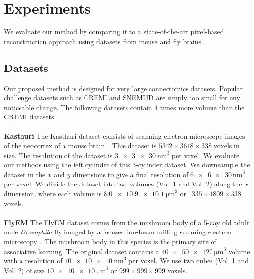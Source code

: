 \section{Experiments}

We evaluate our method by comparing it to a state-of-the-art pixel-based reconstruction approach using datasets from mouse and fly brains.

\subsection{Datasets}
\label{sec:dataset}

Our proposed method is designed for very large connectomics datasets. 
Popular challenge datasets such as CREMI and SNEMI3D are simply too small for any noticeable change. 
The following datasets contain 4 times more volume than the CREMI datasets. 
\\~\\
\noindent\textbf{Kasthuri}
The Kasthuri dataset consists of scanning electron microscope images of the neocortex of a mouse brain~\cite{kasthuri2015saturated}. 
This dataset is $5342 \times 3618 \times 338$ voxels in size. 
The resolution of the dataset is $\SI[product-units=single]{3 x 3 x 30}{\nano\meter}^3$ per voxel. 
We evaluate our methods using the left cylinder of this 3-cylinder dataset. 
We downsample the dataset in the $x$ and $y$ dimensions to give a final resolution of $\SI[product-units=single]{6 x 6 x 30}{\nano\meter}^3$ per voxel. 
We divide the dataset into two volumes (Vol. 1 and Vol. 2) along the $x$ dimension, where each volume is $\SI[product-units=single]{8.0 x 10.9 x 10.1}{\micro\meter}^3$ or $1335 \times 1809 \times 338$ voxels.
\\~\\
\noindent\textbf{FlyEM}
The FlyEM dataset comes from the mushroom body of a 5-day old adult male \textit{Drosophila} fly imaged by a focused ion-beam milling scanning electron microscopy~\cite{takemura2017connectome}.
The mushroom body in this species is the primary site of associative learning. 
The original dataset contains a $\SI[product-units=single]{40 x 50 x 120}{\micro\meter}^3$ volume with a resolution of $\SI[product-units=single]{10 x 10 x 10}{\nano\meter}^3$ per voxel. 
We use two cubes (Vol. 1 and Vol. 2) of size $\SI[product-units=single]{10 x 10 x 10}{\micro\meter}^3$ or $999 \times 999 \times 999$ voxels.

